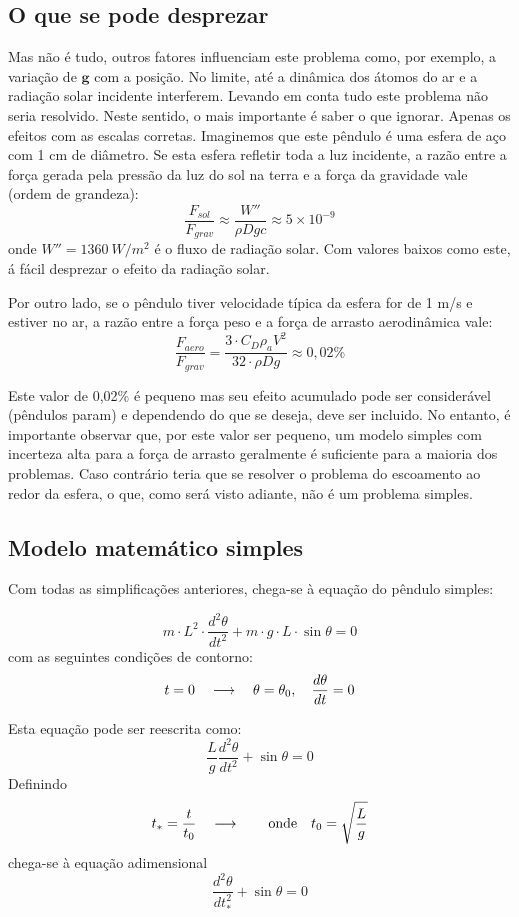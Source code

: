 \subsection{O que se pode desprezar}
Mas não é tudo, outros fatores influenciam este problema como, por exemplo, a variação de $\textbf{g}$ com a posição. No limite, até a dinâmica dos átomos do ar e a radiação solar incidente interferem. Levando em conta tudo este problema não seria resolvido. Neste sentido, o mais importante é saber o que ignorar. Apenas os efeitos com as escalas corretas. Imaginemos que este pêndulo é uma esfera de aço com 1 cm de diâmetro. Se esta esfera refletir toda a luz incidente, a razão entre a força gerada pela pressão da luz do sol na terra e a força da gravidade vale (ordem de grandeza):
\[
\frac{F_{sol}}{F_{grav}} \approx \frac{W''}{\rho D g c} \approx 5\times 10^{-9}
\]
onde $W''=1360\:W/m^2$ é o fluxo de radiação solar. Com valores baixos como este, á fácil desprezar o efeito da radiação solar. 

Por outro lado, se o pêndulo tiver velocidade típica da esfera for de 1 m/s e estiver no ar, a razão entre a força peso e a força de arrasto aerodinâmica vale:
\[
\frac{F_{aero}}{F_{grav}} = \frac{3\cdot C_D \rho_a V^2}{32\cdot\rho D g} \approx 0,02\%
\]

Este valor de 0,02\% é pequeno mas seu efeito acumulado pode ser considerável (pêndulos param) e dependendo do que se deseja, deve ser incluido. No entanto, é importante observar que, por este valor ser pequeno, um modelo simples com incerteza alta para a força de arrasto geralmente é suficiente para a maioria dos problemas. Caso contrário teria que se resolver o problema do escoamento ao redor da esfera, o que, como será visto adiante, não é um problema simples.

\subsection{Modelo matemático simples}
Com todas as simplificações anteriores, chega-se à equação do pêndulo simples:

\[
m\cdot L^2\cdot\frac{d^2\theta}{dt^2} + m\cdot g\cdot L\cdot \sin\theta = 0
\]
com as seguintes condições de contorno:
\[
t = 0 \quad\longrightarrow\quad \theta=\theta_0, \quad\frac{d\theta}{dt} = 0
\]

Esta equação pode ser reescrita como:
\[
\frac{L}{g}\frac{d^2\theta}{dt^2} + \sin\theta = 0 
\]
Definindo 
\[
t_* = \frac{t}{t_0}\quad\longrightarrow\quad \quad\text{onde}\quad t_0 = \sqrt{\frac{L}{g}}
\]
chega-se à equação adimensional
\[
\frac{d^2\theta}{dt_*^2} + \sin\theta = 0 
\]

